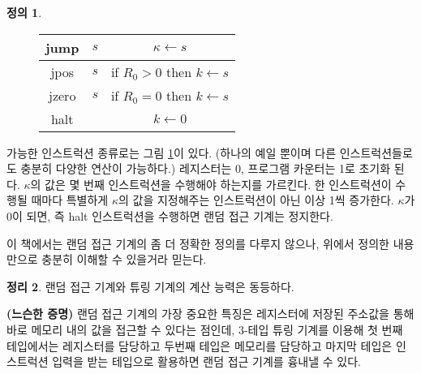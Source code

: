 \documentclass[b5paper, 10pt]{book}
\theoremstyle{definition}
\newtheorem{defn}{정의}[chapter]
\newtheorem{thm}[defn]{정리}
\newenvironment{pf*}{\pushQED{\qed}\pf}{\popQED\endpf}
\begin{document}
\begin{defn}
\begin{figure}[!ht]
\begin{tabular}{ ccc }
            \hline 
            jump & $s$ & $\kappa \gets s$ \\ 
            \hline 
            jpos & $s$ & if $R_0 > 0$ then $k \gets s$ \\ 
            \hline 
            jzero & $s$ & if $R_0 = 0$ then $k \gets s$ \\ 
            \hline 
            halt & & $k \gets 0$
        \end{tabular}
        \caption{}
        \label{iiiii}
    \end{figure}
    가능한 인스트럭션 종류로는 그림 \ref{iiiii}이 있다. (하나의 예일 뿐이며 다른 인스트럭션들로도 
    충분히 다양한 연산이 가능하다.)
    레지스터는 0, 프로그램 카운터는 1로 초기화 된다. $\kappa$의 값은 몇 번째 인스트럭션을 수행해야 하는지를 가르킨다.
    한 인스트럭션이 수행될 때마다 특별하게 $\kappa$의 값을 지정해주는 인스트럭션이 아닌 이상 1씩 증가한다.
    $\kappa$가 0이 되면, 즉 halt 인스트럭션을 수행하면 랜덤 접근 기계는 정지한다.
\end{defn}
이 책에서는 랜덤 접근 기계의 좀 더 정확한 정의를 다루지 않으나, 위에서 정의한 내용만으로 
충분히 이해할 수 있을거라 믿는다. 
\begin{thm}
    랜덤 접근 기계와 튜링 기계의 계산 능력은 동등하다.
\end{thm}
\begin{pf*}
    \textbf{(느슨한 증명)} 랜덤 접근 기계의 가장 중요한 특징은 레지스터에 저장된 주소값을 통해
    바로 메모리 내의 값을 접근할 수 있다는 점인데, $3$-테입 튜링 기계를 이용해 첫 번째 테입에서는 레지스터를
    담당하고 두번째 테입은 메모리를 담당하고 마지막 테입은 인스트럭션 입력을 받는 테입으로 활용하면
    랜덤 접근 기계를 흉내낼 수 있다.
\end{pf*}
\end{document}
